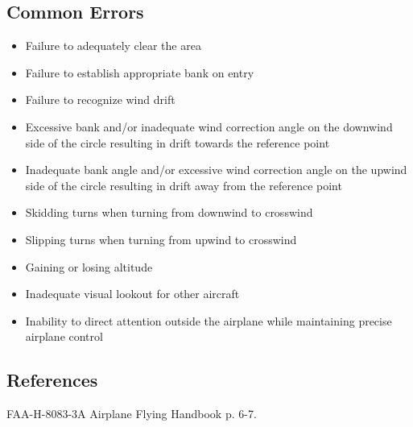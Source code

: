 \subsection{Common Errors}

\begin{itemize}
  \item Failure to adequately clear the area
  \item Failure to establish appropriate bank on entry
  \item Failure to recognize wind drift
  \item Excessive bank and/or inadequate wind correction angle on the downwind
    side of the circle resulting in drift towards the reference point
  \item Inadequate bank angle and/or excessive wind correction angle on the
    upwind side of the circle resulting in drift away from the reference point
  \item Skidding turns when turning from downwind to crosswind
  \item Slipping turns when turning from upwind to crosswind
  \item Gaining or losing altitude
  \item Inadequate visual lookout for other aircraft
  \item Inability to direct attention outside the airplane while maintaining
    precise airplane control
\end{itemize}

\subsection{References}

FAA-H-8083-3A Airplane Flying Handbook p. 6-7.

